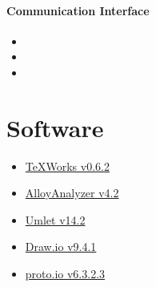 \paragraph{Communication Interface } 
\begin{itemize}
\item {}
\item {}
\item {}
\end{itemize}

\section{Software}
\begin{itemize}
\item \href{http://www.tug.org/texworks/}{TeXWorks v0.6.2}
\item \href{http://alloytools.org/}{AlloyAnalyzer v4.2}
\item \href{https://www.umlet.com/}{Umlet v14.2}
\item \href{https://about.draw.io/}{Draw.io v9.4.1}
\item \href{https://proto.io/}{proto.io v6.3.2.3}
\end{itemize}
